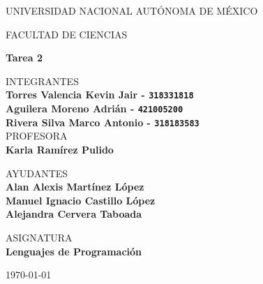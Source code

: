 \documentclass{article}
\begin{document}
	\begin{center}
	\vspace{0.8cm}
	\LARGE
	UNIVERSIDAD NACIONAL AUTÓNOMA DE MÉXICO 
	
	\vspace{0.7cm}
	\LARGE
	FACULTAD DE CIENCIAS
	
	\vspace{0.8 cm}	
	\Large
	\textbf{Tarea 2}

	\vspace{0.8 cm}
	\normalsize	
	INTEGRANTES \\
	\vspace{.2cm}
	\large
	\textbf{Torres Valencia Kevin Jair - \texttt{318331818}}\\
	\textbf{Aguilera Moreno Adrián - \texttt{421005200}}\\
	\textbf{Rivera Silva Marco Antonio - \texttt{318183583}}\\
	
	\vspace{1 cm}
	\normalsize	
	PROFESORA \\
	\vspace{.2cm}
	\large
	\textbf{Karla Ramírez Pulido}
	
	\vspace{1 cm}
	AYUDANTES \\
	\vspace{.2cm}
	\large
	\textbf{Alan Alexis Martínez López}\\
	\textbf{Manuel Ignacio Castillo López}\\
	\textbf{Alejandra Cervera Taboada}
	\vspace{1.3cm}
	
	\normalsize	
	ASIGNATURA \\
	\vspace{.2cm}
	\large
	\textbf{Lenguajes de Programación}
	
	\vspace{1 cm}
	\today
	\end{center}
	
	\newpage
	
        
        
        
	
        
	
	
	
\end{document}
